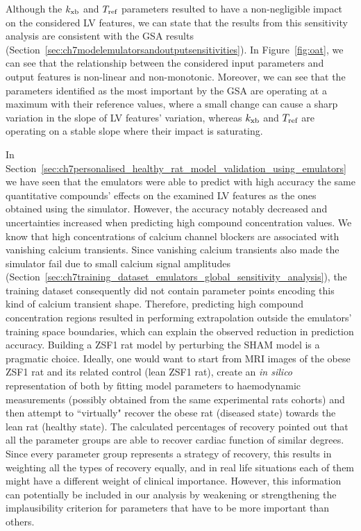 \vspace{0.2cm}\noindent
Although the $k_{\textrm{xb}}$ and $T_{\textrm{ref}}$ parameters resulted to have a non-negligible impact on the considered LV features, we can state that the results from this sensitivity analysis are consistent with the GSA results (Section~\ref{sec:ch7modelemulatorsandoutputsensitivities}). In Figure~\ref{fig:oat}, we can see that the relationship between the considered input parameters and output features is non-linear and non-monotonic. Moreover, we can see that the parameters identified as the most important by the GSA are operating at a maximum with their reference values, where a small change can cause a sharp variation in the slope of LV features' variation, whereas $k_{\textrm{xb}}$ and $T_{\textrm{ref}}$ are operating on a stable slope where their impact is saturating.

\vspace{0.2cm}
In Section~\ref{sec:ch7personalised_healthy_rat_model_validation_using_emulators} we have seen that the emulators were able to predict with high accuracy the same quantitative compounds' effects on the examined LV features as the ones obtained using the simulator. However, the accuracy notably decreased and uncertainties increased when predicting high compound concentration values. We know that high concentrations of calcium channel blockers are associated with vanishing calcium transients. Since vanishing calcium transients also made the simulator fail due to small calcium signal amplitudes (Section~\ref{sec:ch7training_dataset_emulators_global_sensitivity_analysis}), the training dataset consequently did not contain parameter points encoding this kind of calcium transient shape. Therefore, predicting high compound concentration regions resulted in performing extrapolation outside the emulators' training space boundaries, which can explain the observed reduction in prediction accuracy. Building a ZSF1 rat model by perturbing the SHAM model is a pragmatic choice. Ideally, one would want to start from MRI images of the obese ZSF1 rat and its related control (lean ZSF1 rat), create an \textit{in silico} representation of both by fitting model parameters to haemodynamic measurements (possibly obtained from the same experimental rats cohorts) and then attempt to ``virtually" recover the obese rat (diseased state) towards the lean rat (healthy state). The calculated percentages of recovery pointed out that all the parameter groups are able to recover cardiac function of similar degrees. Since every parameter group represents a strategy of recovery, this results in weighting all the types of recovery equally, and in real life situations each of them might have a different weight of clinical importance. However, this information can potentially be included in our analysis by weakening or strengthening the implausibility criterion for parameters that have to be more important than others.


